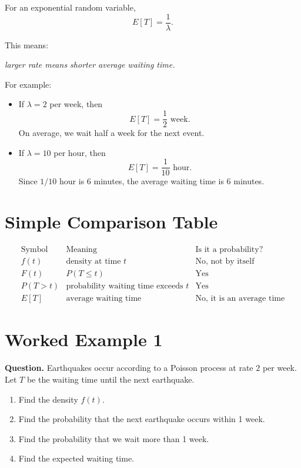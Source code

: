 \documentclass[12pt]{article}
\begin{document}
For an exponential random variable,
\[
E[T]=\frac{1}{\lambda}.
\]

This means:

\begin{center}
\textit{larger rate means shorter average waiting time.}
\end{center}

For example:

\begin{itemize}
    \item If \(\lambda=2\) per week, then
    \[
    E[T]=\frac{1}{2}\text{ week}.
    \]
    On average, we wait half a week for the next event.

    \item If \(\lambda=10\) per hour, then
    \[
    E[T]=\frac{1}{10}\text{ hour}.
    \]
    Since \(1/10\) hour is 6 minutes, the average waiting time is 6 minutes.
\end{itemize}

\section{Simple Comparison Table}

\[
\begin{array}{c|c|c}
\text{Symbol} & \text{Meaning} & \text{Is it a probability?}\\
\hline
f(t) & \text{density at time }t & \text{No, not by itself}\\
F(t) & P(T\leq t) & \text{Yes}\\
P(T>t) & \text{probability waiting time exceeds }t & \text{Yes}\\
E[T] & \text{average waiting time} & \text{No, it is an average time}
\end{array}
\]

\section{Worked Example 1}

\textbf{Question.}
Earthquakes occur according to a Poisson process at rate \(2\) per week. Let \(T\) be the waiting time until the next earthquake.

\begin{enumerate}[label=(\alph*)]
    \item Find the density \(f(t)\).
    \item Find the probability that the next earthquake occurs within 1 week.
    \item Find the probability that we wait more than 1 week.
    \item Find the expected waiting time.
\end{enumerate}
\end{document}
